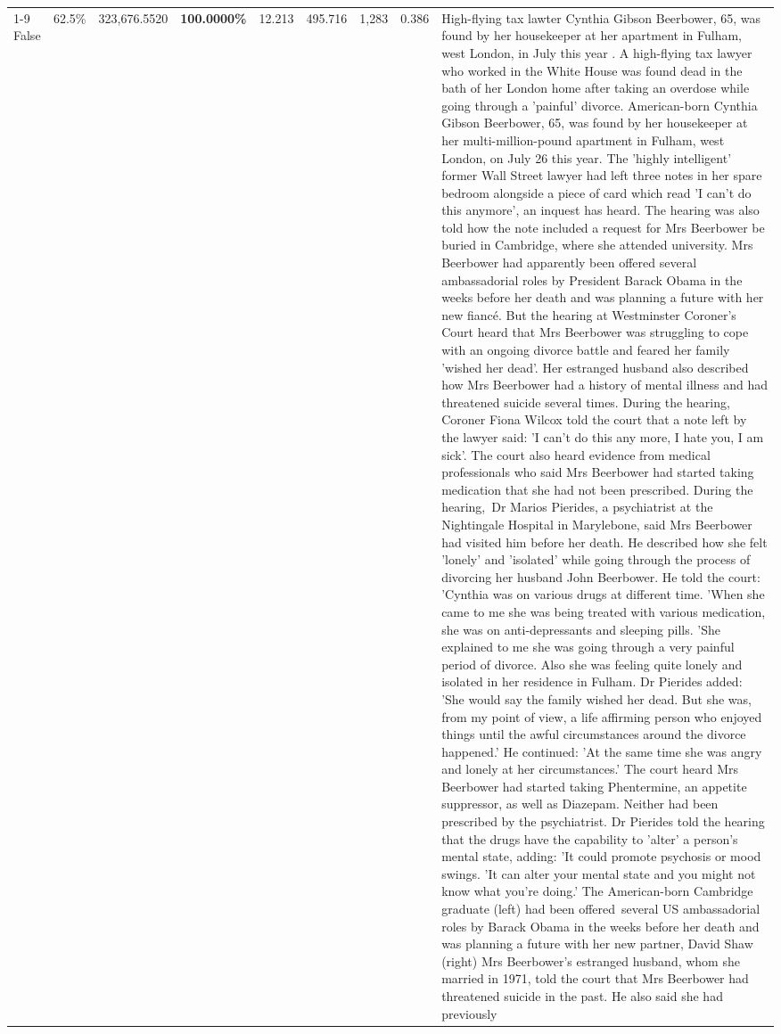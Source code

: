 \begin{table}[H]
\begin{tabular}{lllrlllll}
\cline{1-9}
False & 62.5\% & 323,676.5520 & \bfseries \color{red} 100.0000\% & 12.213 & 495.716 & 1,283 & 0.386 & High-flying tax lawter Cynthia Gibson Beerbower, 65, was found by her housekeeper at her apartment in Fulham, west London, in July this year . A high-flying tax lawyer who worked in the White House was found dead in the bath of her London home after taking an overdose while going through a 'painful' divorce. American-born Cynthia Gibson Beerbower, 65, was found by her housekeeper at her multi-million-pound apartment in Fulham, west London, on July 26 this year. The 'highly intelligent' former Wall Street lawyer had left three notes in her spare bedroom alongside a piece of card which read 'I can't do this anymore', an inquest has heard. The hearing was also told how the note included a request for Mrs Beerbower be buried in Cambridge, where she attended university. Mrs Beerbower had apparently been offered several ambassadorial roles by President Barack Obama in the weeks before her death and was planning a future with her new fiancé. But the hearing at Westminster Coroner's Court heard that Mrs Beerbower was struggling to cope with an ongoing divorce battle and feared her family 'wished her dead'. Her estranged husband also described how Mrs Beerbower had a history of mental illness and had threatened suicide several times. During the hearing, Coroner Fiona Wilcox told the court that a note left by the lawyer said: 'I can't do this any more, I hate you, I am sick'. The court also heard evidence from medical professionals who said Mrs Beerbower had started taking medication that she had not been prescribed. During the hearing, Dr Marios Pierides, a psychiatrist at the Nightingale Hospital in Marylebone, said Mrs Beerbower had visited him before her death. He described how she felt 'lonely' and 'isolated' while going through the process of divorcing her husband John Beerbower. He told the court: 'Cynthia was on various drugs at different time. 'When she came to me she was being treated with various medication, she was on anti-depressants and sleeping pills. 'She explained to me she was going through a very painful period of divorce. Also she was feeling quite lonely and isolated in her residence in Fulham. Dr Pierides added: 'She would say the family wished her dead. But she was, from my point of view, a life affirming person who enjoyed things until the awful circumstances around the divorce happened.' He continued: 'At the same time she was angry and lonely at her circumstances.' The court heard Mrs Beerbower had started taking Phentermine, an appetite suppressor, as well as Diazepam. Neither had been prescribed by the psychiatrist. Dr Pierides told the hearing that the drugs have the capability to 'alter' a person's mental state, adding: 'It could promote psychosis or mood swings. 'It can alter your mental state and you might not know what you're doing.' The American-born Cambridge graduate (left) had been offered several US ambassadorial roles by Barack Obama in the weeks before her death and was planning a future with her new partner, David Shaw (right) Mrs Beerbower's estranged husband, whom she married in 1971, told the court that Mrs Beerbower had threatened suicide in the past. He also said she had previously 
\end{tabular}
\end{table}
